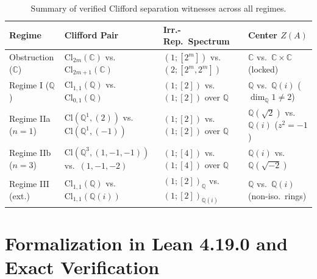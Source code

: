 \documentclass[11pt,a4paper]{article}
\theoremstyle{plain}
\theoremstyle{definition}
\newcommand{\Cl}{\mathrm{Cl}}
\newcommand{\Q}{\mathbb{Q}}
\newcommand{\C}{\mathbb{C}}
\begin{document}
\begin{table}[htbp]
\centering
\caption{Summary of verified Clifford separation witnesses across all regimes.}
\label{tab:witnesses}
\footnotesize
\setlength{\tabcolsep}{5pt}
\begin{tabular}{@{}llll@{}}
\toprule
\textbf{Regime} & \textbf{Clifford Pair} & \textbf{Irr.-Rep.\ Spectrum} & \textbf{Center $Z(A)$} \\
\midrule
Obstruction ($\C$) & $\Cl_{2m}(\C)$ vs.\ $\Cl_{2m+1}(\C)$ & $(1;[2^m])$ vs.\ $(2;[2^m,2^m])$ & $\C$ vs.\ $\C \times \C$ (locked) \\
Regime I ($\Q$) & $\Cl_{1,1}(\Q)$ vs.\ $\Cl_{0,1}(\Q)$ & $(1;[2])$ vs.\ $(1;[2])$ over $\Q$ & $\Q$ vs.\ $\Q(i)$ ($\dim_\Q 1 \neq 2$) \\
Regime IIa ($n=1$) & $\Cl(\Q^1,(2))$ vs.\ $\Cl(\Q^1,(-1))$ & $(1;[2])$ vs.\ $(1;[2])$ over $\Q$ & $\Q(\sqrt{2})$ vs.\ $\Q(i)$ ($z^2=-1$) \\
Regime IIb ($n=3$) & $\Cl(\Q^3,(1,-1,-1))$ vs.\ $(1,-1,-2)$ & $(1;[4])$ vs.\ $(1;[4])$ over $\Q$ & $\Q(i)$ vs.\ $\Q(\sqrt{-2})$ \\
Regime III (ext.) & $\Cl_{1,1}(\Q)$ vs.\ $\Cl_{1,1}(\Q(i))$ & $(1;[2])_{\Q}$ vs.\ $(1;[2])_{\Q(i)}$ & $\Q$ vs.\ $\Q(i)$ (non-iso.\ rings) \\
\bottomrule
\end{tabular}
\end{table}

\section{Formalization in Lean 4.19.0 and Exact Verification}
\end{document}
